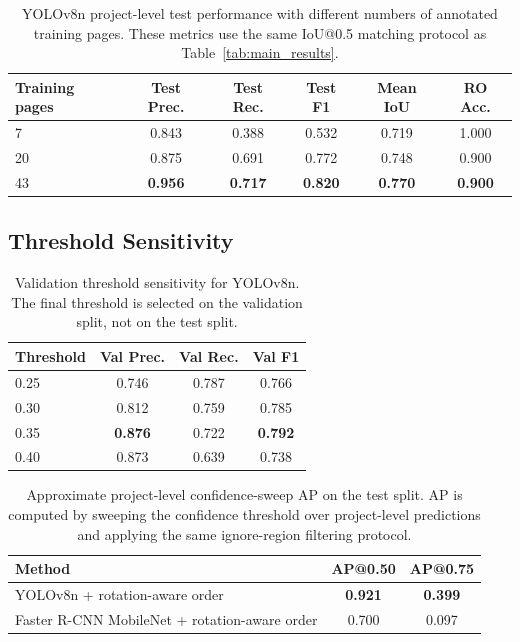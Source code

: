 \documentclass[12pt]{article}
\begin{document}
\begin{table}[t]
\centering
\caption{YOLOv8n project-level test performance with different numbers of annotated training pages. These metrics use the same IoU@0.5 matching protocol as Table~\ref{tab:main_results}.}
\label{tab:train_size}
\begin{tabular}{lccccc}
\toprule
Training pages & Test Prec. & Test Rec. & Test F1 & Mean IoU & RO Acc. \\
\midrule
7 & 0.843 & 0.388 & 0.532 & 0.719 & 1.000 \\
20 & 0.875 & 0.691 & 0.772 & 0.748 & 0.900 \\
43 & \textbf{0.956} & \textbf{0.717} & \textbf{0.820} & \textbf{0.770} & \textbf{0.900} \\
\bottomrule
\end{tabular}
\end{table}

\subsection{Threshold Sensitivity}
\begin{table}[t]
\centering
\caption{Validation threshold sensitivity for YOLOv8n. The final threshold is selected on the validation split, not on the test split.}
\label{tab:threshold}
\begin{tabular}{lccc}
\toprule
Threshold & Val Prec. & Val Rec. & Val F1 \\
\midrule
0.25 & 0.746 & 0.787 & 0.766 \\
0.30 & 0.812 & 0.759 & 0.785 \\
0.35 & \textbf{0.876} & 0.722 & \textbf{0.792} \\
0.40 & 0.873 & 0.639 & 0.738 \\
\bottomrule
\end{tabular}
\end{table}


\begin{table}[t]
\centering
\caption{Approximate project-level confidence-sweep AP on the test split. AP is computed by sweeping the confidence threshold over project-level predictions and applying the same ignore-region filtering protocol.}
\label{tab:project_ap}
\begin{tabular}{lcc}
\toprule
Method & AP@0.50 & AP@0.75 \\
\midrule
YOLOv8n + rotation-aware order & \textbf{0.921} & \textbf{0.399} \\
Faster R-CNN MobileNet + rotation-aware order & 0.700 & 0.097 \\
\bottomrule
\end{tabular}
\end{table}
\end{document}

